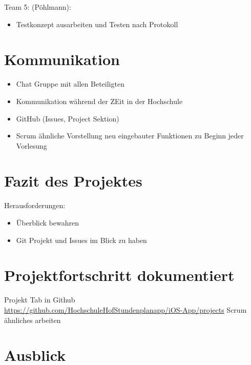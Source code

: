 Team 5: (Pöhlmann):
\begin{itemize}
\item Testkonzept ausarbeiten und Testen nach Protokoll
\end{itemize}


\section{Kommunikation}
\begin{itemize}
\item Chat Gruppe mit allen Beteiligten
\item Kommunikation während der ZEit in der Hochschule
\item GitHub (Issues, Project Sektion)
\item Scrum ähnliche Vorstellung neu eingebauter Funktionen zu Beginn jeder Vorlesung
\end{itemize}


\section{Fazit des Projektes}
Herausforderungen:
\begin{itemize}
\item Überblick bewahren
\item Git Projekt und Issues im Blick zu haben
\end{itemize}


\section{Projektfortschritt dokumentiert}
Projekt Tab in Github\\
\url{https://github.com/HochschuleHofStundenplanapp/iOS-App/projects}
Scrum ähnliches arbeiten




\section{Ausblick}

